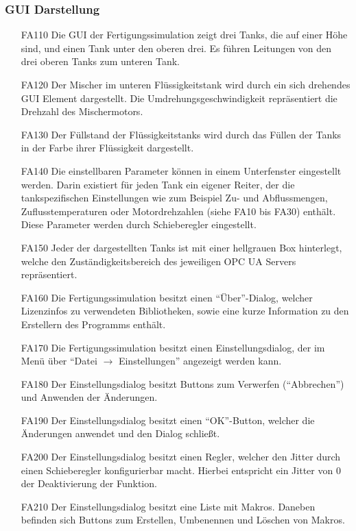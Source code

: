 \documentclass[parskip=full]{scrartcl}
\begin{document}
\subsubsection{GUI Darstellung}
\begin{enumerate}
\item[FA110] Die GUI der Fertigungssimulation zeigt drei Tanks, die auf einer Höhe sind, und einen Tank unter den oberen drei.
Es führen Leitungen von den drei oberen Tanks zum unteren Tank.
\item[FA120] Der Mischer im unteren Flüssigkeitstank wird durch ein sich drehendes GUI Element dargestellt.
Die Umdrehungsgeschwindigkeit repräsentiert die Drehzahl des Mischermotors.
\item[FA130] Der Füllstand der Flüssigkeitstanks wird durch das Füllen der Tanks in der Farbe ihrer Flüssigkeit dargestellt.
\item[FA140] Die einstellbaren Parameter können in einem Unterfenster eingestellt werden. Darin existiert für jeden Tank ein eigener Reiter, der die 
tankspezifischen Einstellungen wie zum Beispiel Zu- und Abflussmengen, Zuflusstemperaturen oder Motordrehzahlen (siehe FA10 bis FA30) enthält.
Diese Parameter werden durch Schieberegler eingestellt.
\item[FA150] Jeder der dargestellten Tanks ist mit einer hellgrauen Box hinterlegt, welche den Zuständigkeitsbereich des jeweiligen OPC UA Servers repräsentiert.
\item[FA160] Die Fertigungssimulation besitzt einen ``Über''-Dialog, welcher Lizenzinfos zu verwendeten Bibliotheken,
  sowie eine kurze Information zu den Erstellern des Programms enthält.
\item[FA170] Die Fertigungssimulation besitzt einen Einstellungsdialog, der im Menü über ``Datei $\rightarrow$ Einstellungen'' angezeigt werden kann.
\item[FA180] Der Einstellungsdialog besitzt Buttons zum Verwerfen (``Abbrechen'') und Anwenden der Änderungen.
\item[FA190] Der Einstellungsdialog besitzt einen ``OK''-Button, welcher die Änderungen anwendet und den Dialog schließt.
\item[FA200] Der Einstellungsdialog besitzt einen Regler, welcher den \gls{Jitter} durch einen Schieberegler konfigurierbar macht.
  Hierbei entspricht ein \gls{Jitter} von 0 der Deaktivierung der Funktion.
\item[FA210] Der Einstellungsdialog besitzt eine Liste mit \glspl{Makro}. Daneben befinden sich Buttons zum Erstellen, Umbenennen und Löschen von \glspl{Makro}.
\end{enumerate}
\end{document}
